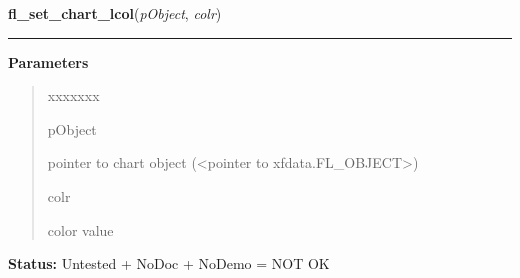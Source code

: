 \hspace{.8\funcindent}\begin{boxedminipage}{\funcwidth}

    \raggedright \textbf{fl\_set\_chart\_lcol}(\textit{pObject}, \textit{colr})

    \vspace{-1.5ex}

    \rule{\textwidth}{0.5\fboxrule}
\setlength{\parskip}{2ex}
\setlength{\parskip}{1ex}
      \textbf{Parameters}
      \vspace{-1ex}

      \begin{quote}
        \begin{Ventry}{xxxxxxx}

          \item[pObject]

          pointer to chart object ({\textless}pointer to 
          xfdata.FL\_OBJECT{\textgreater})

          \item[colr]

          color value

        \end{Ventry}

      \end{quote}

\textbf{Status:} Untested + NoDoc + NoDemo = NOT OK



    \end{boxedminipage}

    \label{xformslib:library:fl_stuff_clipboard}

    \vspace{0.5ex}

